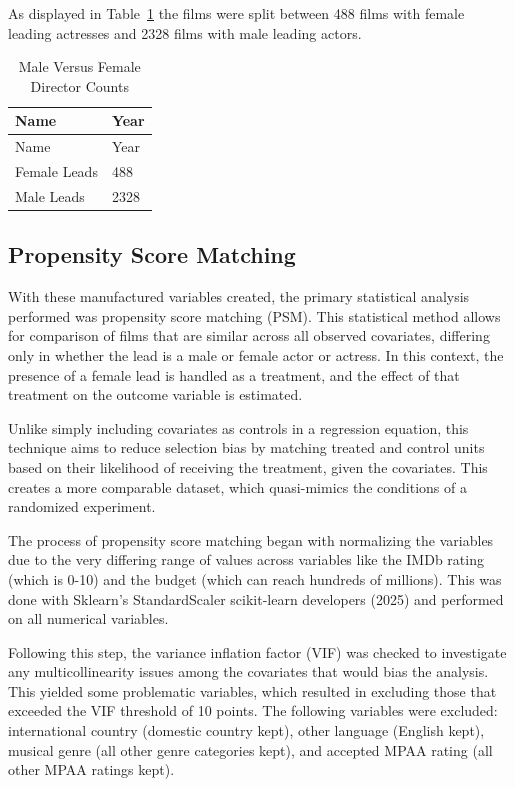 \documentclass[
]{agujournal2019}
\begin{document}
As displayed in Table~\ref{tbl-8} the films were split between 488 films
with female leading actresses and 2328 films with male leading actors.

\begin{longtable}[]{@{}ll@{}}
\caption{Male Versus Female Director Counts}\label{tbl-8}\tabularnewline
\toprule\noalign{}
Name & Year \\
\midrule\noalign{}
\endfirsthead
\toprule\noalign{}
Name & Year \\
\midrule\noalign{}
\endhead
\bottomrule\noalign{}
\endlastfoot
Female Leads & 488 \\
Male Leads & 2328 \\
\end{longtable}

\subsection{Propensity Score Matching}\label{propensity-score-matching}

With these manufactured variables created, the primary statistical
analysis performed was propensity score matching (PSM). This statistical
method allows for comparison of films that are similar across all
observed covariates, differing only in whether the lead is a male or
female actor or actress. In this context, the presence of a female lead
is handled as a treatment, and the effect of that treatment on the
outcome variable is estimated.

Unlike simply including covariates as controls in a regression equation,
this technique aims to reduce selection bias by matching treated and
control units based on their likelihood of receiving the treatment,
given the covariates. This creates a more comparable dataset, which
quasi-mimics the conditions of a randomized experiment.

The process of propensity score matching began with normalizing the
variables due to the very differing range of values across variables
like the IMDb rating (which is 0-10) and the budget (which can reach
hundreds of millions). This was done with Sklearn's StandardScaler
scikit-learn developers (2025) and performed on all numerical variables.

Following this step, the variance inflation factor (VIF) was checked to
investigate any multicollinearity issues among the covariates that would
bias the analysis. This yielded some problematic variables, which
resulted in excluding those that exceeded the VIF threshold of 10
points. The following variables were excluded: international country
(domestic country kept), other language (English kept), musical genre
(all other genre categories kept), and accepted MPAA rating (all other
MPAA ratings kept).
\end{document}
